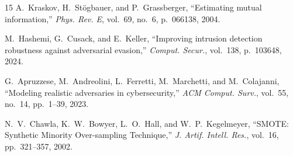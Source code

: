 \documentclass[conference]{IEEEtran}
\begin{document}
\begin{thebibliography}{15}
A.~Kraskov, H.~St\"{o}gbauer, and P.~Grassberger, ``Estimating mutual information,'' \emph{Phys. Rev. E}, vol.~69, no.~6, p.~066138, 2004.

M.~Hashemi, G.~Cusack, and E.~Keller, ``Improving intrusion detection robustness against adversarial evasion,'' \emph{Comput. Secur.}, vol.~138, p.~103648, 2024.

G.~Apruzzese, M.~Andreolini, L.~Ferretti, M.~Marchetti, and M.~Colajanni, ``Modeling realistic adversaries in cybersecurity,'' \emph{ACM Comput. Surv.}, vol.~55, no.~14, pp.~1--39, 2023.

N.~V.~Chawla, K.~W.~Bowyer, L.~O.~Hall, and W.~P.~Kegelmeyer, ``SMOTE: Synthetic Minority Over-sampling Technique,'' \emph{J. Artif. Intell. Res.}, vol.~16, pp.~321--357, 2002.

\end{thebibliography}
\end{document}
